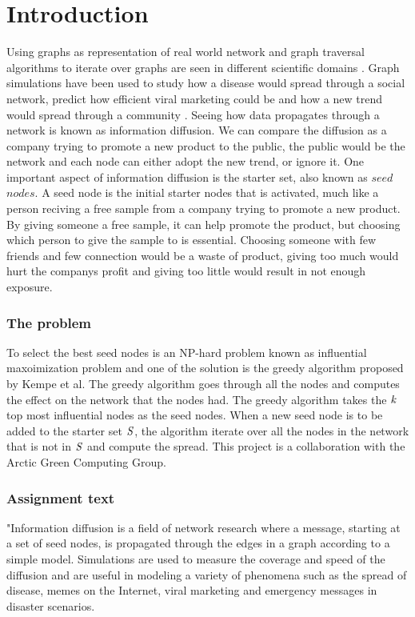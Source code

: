 \chapter{Introduction} \label{intro}

Using graphs as representation of real world network and graph traversal algorithms to iterate over graphs are seen in different scientific domains \cite{HybridBFS2015}. Graph simulations have been used to study how a disease would spread through a social network\cite{DiseasOutbreak}, predict how efficient viral marketing could be \cite{ViralMarketing} and how a new trend would spread through a community \cite{MaximizeSpread2003}. Seeing how data propagates through a network is known as information diffusion. We can compare the diffusion as a company trying to promote a new product to the public, the public would be the network and each node can either adopt the new trend, or ignore it. One important aspect of information diffusion is the starter set, also known as $seed$ $nodes$. A seed node is the initial starter nodes that is activated, much like a person reciving a free sample from a company trying to promote a new product. By giving someone a free sample, it can help promote the product, but choosing which person to give the sample to is essential. Choosing someone with few friends and few connection would be a waste of product, giving too much would hurt the companys profit and giving too little would result in not enough exposure.

\subsection{The problem}
To select the best seed nodes is an NP-hard problem known as influential maxoimization problem \cite{MaximizeSpread2003} and one of the solution is the greedy algorithm \cite{MaximizeSpread2015} proposed by Kempe et al. The greedy algorithm goes through all the nodes and computes the effect on the network that the nodes had. The greedy algorithm takes the $\it{k}$ top most influential nodes as the seed nodes. When a new seed node is to be added to the starter set $\it{S}$, the algorithm iterate over all the nodes in the network that is not in $\it{S}$ and compute the spread. This project is a collaboration with the Arctic Green Computing Group. 

\subsection{Assignment text}
"Information diffusion is a field of network research where a message, starting at a set of seed nodes, is propagated through the edges in a graph according to a simple model. Simulations are used to measure the coverage and speed of the diffusion and are useful in modeling a variety of phenomena such as the spread of disease, memes on the Internet, viral marketing and emergency messages in disaster scenarios.

